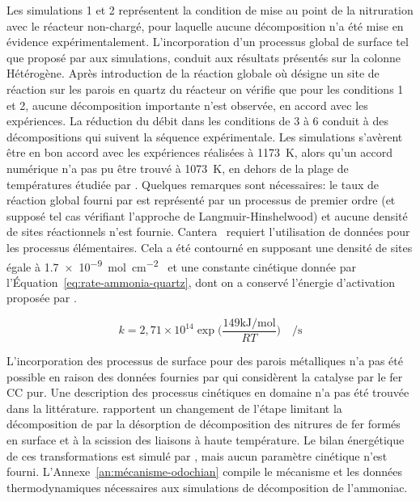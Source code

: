 Les simulations \og{}1\fg{} et \og{}2\fg{} représentent la condition de mise au point de la nitruration avec le réacteur non-chargé, pour laquelle aucune décomposition n'a été mise en évidence expérimentalement. L'incorporation d'un processus global de surface tel que proposé par \citet{Cooper1988} aux simulations, conduit aux résultats présentés sur la colonne \og{}Hétérogène\fg{}. Après introduction de la réaction globale  \textendash{} où  désigne un site de réaction sur les parois en quartz du réacteur \textendash{} on vérifie que pour les conditions \og{}1\fg{} et \og{}2\fg{}, aucune décomposition importante n'est observée, en accord avec les expériences. La réduction du débit dans les conditions de \og{}3\fg{} à \og{}6\fg{} conduit à des décompositions qui suivent la séquence expérimentale. Les simulations s'avèrent être en bon accord avec les expériences réalisées à \SI{1173}{\kelvin}, alors qu'un accord numérique n'a pas pu être trouvé à \SI{1073}{\kelvin}, en dehors de la plage de températures étudiée par \citet{Cooper1988}. Quelques remarques sont nécessaires: le taux de réaction global fourni par \citet{Cooper1988} est représenté par un processus de premier ordre (et supposé tel cas vérifiant l'approche de Langmuir-Hinshelwood) et aucune densité de sites réactionnels n'est fournie. Cantera~\cite{Cantera2014} requiert l'utilisation de données pour les processus élémentaires. Cela a été contourné en supposant une densité de sites égale à \SI{1,7e-9}{\mole\per\square\centi\metre}~\cite{Tang20151161} et une constante cinétique donnée par l'Équation~\ref{eq:rate-ammonia-quartz}, dont on a conservé l'énergie d'activation proposée par \citet{Cooper1988}.

\begin{equation}
  k{}={}2,71{}\times{}10^{14}{}\exp\biggr(\frac{149\si{\kilo\joule\per\mole}}{RT}\biggr)
  \quad\si{\per\second}
  \label{eq:rate-ammonia-quartz}
\end{equation}

L'incorporation des processus de surface pour des parois métalliques n'a pas été possible en raison des données fournies par \citet{Ertl1980,Arabczyk1999} qui considèrent la catalyse par le fer CC pur. Une description des processus cinétiques en domaine  n'a pas été trouvée dans la littérature. \citet{Bell2016} rapportent un changement de l'étape limitant la décomposition de  par la désorption de  \textendash{} décomposition des nitrures de fer formés en surface \textendash{} et à la scission des liaisons  à haute température. Le bilan énergétique de ces transformations est simulé par \citet{Lanzani20106571}, mais aucun paramètre cinétique n'est fourni. L'Annexe~\ref{an:mécanisme-odochian} compile le mécanisme et les données thermodynamiques nécessaires aux simulations de décomposition de l'ammoniac.

